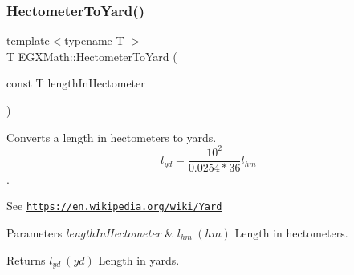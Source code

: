 \subsubsection{\texorpdfstring{Hectometer\+To\+Yard()}{HectometerToYard()}}
{\footnotesize\ttfamily template$<$typename T $>$ \\
T E\+G\+X\+Math\+::\+Hectometer\+To\+Yard (\begin{DoxyParamCaption}\item[{const T}]{length\+In\+Hectometer }\end{DoxyParamCaption})}



Converts a length in hectometers to yards. \[ l_{yd}= \frac{10^{2}}{0.0254 * 36} l_{hm} \]. 

See \href{https://en.wikipedia.org/wiki/Yard}{\tt https\+://en.\+wikipedia.\+org/wiki/\+Yard} 
\begin{DoxyParams}{Parameters}
{\em length\+In\+Hectometer} & $ l_{hm}\ (hm)$ Length in hectometers. \\
\hline
\end{DoxyParams}
\begin{DoxyReturn}{Returns}
$ l_{yd}\ (yd)$ Length in yards. 
\end{DoxyReturn}
